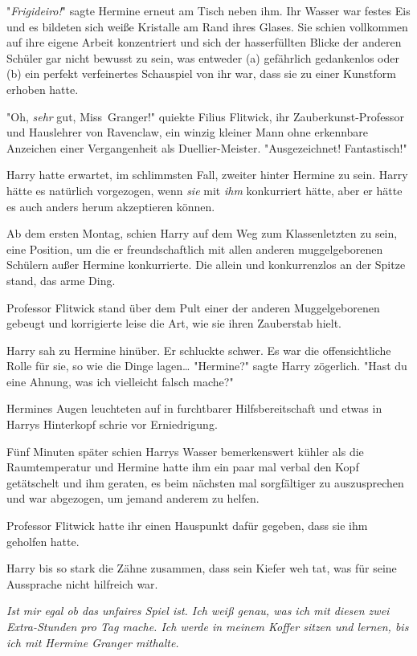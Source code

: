 {"\emph{Frigideiro!}" sagte Hermine erneut am Tisch neben ihm. Ihr Wasser war festes Eis und es bildeten sich weiße Kristalle am Rand ihres Glases. Sie schien vollkommen auf ihre eigene Arbeit konzentriert und sich der hasserfüllten Blicke der anderen Schüler gar nicht bewusst zu sein, was entweder (a) gefährlich gedankenlos oder (b) ein perfekt verfeinertes Schauspiel von ihr war, dass sie zu einer Kunstform erhoben hatte.

"Oh, \emph{sehr} gut, Miss~Granger!" quiekte Filius Flitwick, ihr Zauberkunst-Professor und Hauslehrer von Ravenclaw, ein winzig kleiner Mann ohne erkennbare Anzeichen einer Vergangenheit als Duellier-Meister. "Ausgezeichnet! Fantastisch!"

Harry hatte erwartet, im schlimmsten Fall, zweiter hinter Hermine zu sein. Harry hätte es natürlich vorgezogen, wenn \emph{sie} mit \emph{ihm} konkurriert hätte, aber er hätte es auch anders herum akzeptieren können.

Ab dem ersten Montag, schien Harry auf dem Weg zum Klassenletzten zu sein, eine Position, um die er freundschaftlich mit allen anderen muggelgeborenen Schülern außer Hermine konkurrierte. Die allein und konkurrenzlos an der Spitze stand, das arme Ding.

Professor Flitwick stand über dem Pult einer der anderen Muggelgeborenen gebeugt und korrigierte leise die Art, wie sie ihren Zauberstab hielt.

Harry sah zu Hermine hinüber. Er schluckte schwer. Es war die offensichtliche Rolle für sie, so wie die Dinge lagen… "Hermine?" sagte Harry zögerlich. "Hast du eine Ahnung, was ich vielleicht falsch mache?"

Hermines Augen leuchteten auf in furchtbarer Hilfsbereitschaft und etwas in Harrys Hinterkopf schrie vor Erniedrigung.

Fünf Minuten später schien Harrys Wasser bemerkenswert kühler als die Raumtemperatur und Hermine hatte ihm ein paar mal verbal den Kopf getätschelt und ihm geraten, es beim nächsten mal sorgfältiger zu auszusprechen und war abgezogen, um jemand anderem zu helfen.

Professor Flitwick hatte ihr einen Hauspunkt dafür gegeben, dass sie ihm geholfen hatte.

Harry bis so stark die Zähne zusammen, dass sein Kiefer weh tat, was für seine Aussprache nicht hilfreich war.

\emph{Ist mir egal ob das unfaires Spiel ist. Ich weiß genau, was ich mit diesen zwei Extra-Stunden pro Tag mache. Ich werde in meinem Koffer sitzen und lernen, bis ich mit Hermine Granger mithalte.}

}
